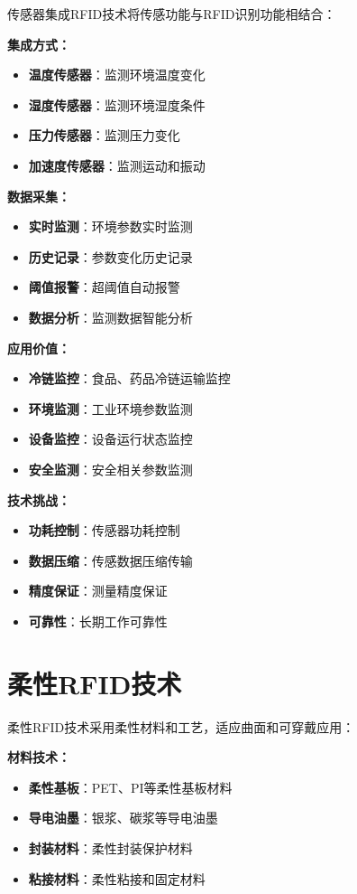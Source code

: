 \documentclass[12pt,UTF8]{ctexbook}
\begin{document}
\begin{itemize}[leftmargin=3.5em]
\begin{itemize}[leftmargin=3.5em]
\begin{itemize}[leftmargin=3.5em]
\begin{itemize}[leftmargin=3.5em]
传感器集成RFID技术将传感功能与RFID识别功能相结合：

\textbf{集成方式：}
\begin{itemize}[leftmargin=3.5em]
    \item \textbf{温度传感器}：监测环境温度变化
    \item \textbf{湿度传感器}：监测环境湿度条件
    \item \textbf{压力传感器}：监测压力变化
    \item \textbf{加速度传感器}：监测运动和振动
\end{itemize}

\textbf{数据采集：}
\begin{itemize}[leftmargin=3.5em]
    \item \textbf{实时监测}：环境参数实时监测
    \item \textbf{历史记录}：参数变化历史记录
    \item \textbf{阈值报警}：超阈值自动报警
    \item \textbf{数据分析}：监测数据智能分析
\end{itemize}

\textbf{应用价值：}
\begin{itemize}[leftmargin=3.5em]
    \item \textbf{冷链监控}：食品、药品冷链运输监控
    \item \textbf{环境监测}：工业环境参数监测
    \item \textbf{设备监控}：设备运行状态监控
    \item \textbf{安全监测}：安全相关参数监测
\end{itemize}

\textbf{技术挑战：}
\begin{itemize}[leftmargin=3.5em]
    \item \textbf{功耗控制}：传感器功耗控制
    \item \textbf{数据压缩}：传感数据压缩传输
    \item \textbf{精度保证}：测量精度保证
    \item \textbf{可靠性}：长期工作可靠性
\end{itemize}

\section{柔性RFID技术}

柔性RFID技术采用柔性材料和工艺，适应曲面和可穿戴应用：

\textbf{材料技术：}
\begin{itemize}[leftmargin=3.5em]
    \item \textbf{柔性基板}：PET、PI等柔性基板材料
    \item \textbf{导电油墨}：银浆、碳浆等导电油墨
    \item \textbf{封装材料}：柔性封装保护材料
    \item \textbf{粘接材料}：柔性粘接和固定材料
\end{itemize}


\end{itemize}
\end{itemize}
\end{itemize}
\end{itemize}
\end{document}
